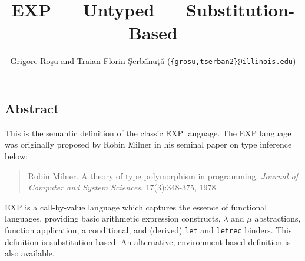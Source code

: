 \setlength{\parindent}{1em}
\title{EXP --- Untyped --- Substitution-Based}
\author{Grigore Ro\c{s}u and
        Traian Florin \c{S}erb\u{a}nu\c{t}\u{a}
	(\texttt{\{grosu,tserban2\}@illinois.edu})}

\maketitle

\begin{latexComment}
\section{Abstract}
This is the \K semantic definition of the classic EXP language.
The EXP language was originally proposed by Robin Milner in his
seminal paper on type inference below:
\begin{quote}
Robin Milner. A theory of type polymorphism in programming.
{\em Journal of Computer and System Sciences}, 17(3):348-375, 1978.
\end{quote}
EXP is a call-by-value language which captures the essence of
functional languages, providing basic arithmetic expression
constructs, $\lambda$ and $\mu$ abstractions, function application, a
conditional, and (derived) \texttt{let} and \texttt{letrec} binders.
This definition is substitution-based. An alternative,
environment-based \K definition is also available.
\end{latexComment}

\vspace*{3ex}
